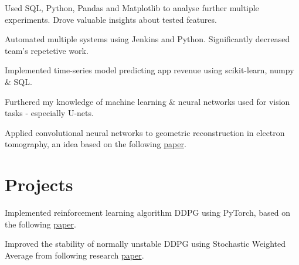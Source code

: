 \documentclass[]{CV}
\begin{document}
\begin{minipage}[t]{0.705\textwidth}
\begin{tightemize}
\item Used SQL, Python, Pandas and Matplotlib to analyse further multiple experiments. Drove valuable insights about tested features.

\item Automated multiple systems using Jenkins and Python. Significantly decreased team's repetetive work.

\item Implemented time-series model predicting app revenue using scikit-learn, numpy \& SQL.

\end{tightemize}

\vspace{\topsep} %
\begin{tightemize}
\item Furthered my knowledge of machine learning \& neural networks used for vision tasks - especially U-nets.

\item  Applied convolutional neural networks to geometric reconstruction in electron tomography, an idea based on the following {\href{https://core.ac.uk/download/pdf/204935374.pdf}{paper}}.

\end{tightemize}



\section{Projects}

\begin{tightemize}

\item Implemented reinforcement learning algorithm DDPG using PyTorch, based on the following {\href{https://arxiv.org/abs/1509.0297[]}{paper}}.

\item Improved the stability of normally unstable DDPG using Stochastic Weighted Average from following research {\href{https://arxiv.org/abs/1803.05407}{paper}}.


\end{tightemize}
\end{minipage}
\end{document}
